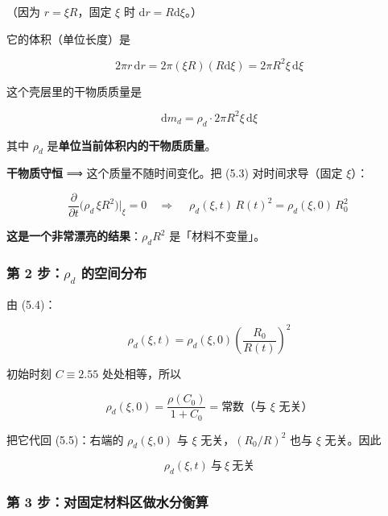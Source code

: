 （因为 $r=\xi R$，固定 $\xi$ 时 $\mathrm{d} r=R\mathrm{d}\xi$。）


它的体积（单位长度）是


\begin{equation}
2\pi r\,\mathrm{d} r=2\pi(\xi R)(R\mathrm{d}\xi)=2\pi R^2\xi\,\mathrm{d}\xi\tag{5.2}
\end{equation}


这个壳层里的干物质质量是


\begin{equation}
\mathrm{d} m_d=\rho_d\cdot2\pi R^2\xi\,\mathrm{d}\xi\tag{5.3}
\end{equation}


其中 $\rho_d$ 是\textbf{单位当前体积内的干物质质量}。


\textbf{干物质守恒} ⟹ 这个质量不随时间变化。把 (5.3) 对时间求导（固定 $\xi$）：


\begin{equation}
\frac{\partial}{\partial t}\Big(\rho_d\,\xi R^2\Big)\Big|_{\xi}=0\quad\Longrightarrow\quad
\boxed{\ \rho_d(\xi,t)\,R(t)^2=\rho_d(\xi,0)\,R_0^2\ }\tag{5.4}
\end{equation}


\textbf{这是一个非常漂亮的结果}：$\rho_dR^2$ 是「材料不变量」。


\subsubsection{第 2 步：$\rho_d$ 的空间分布}


由 (5.4)：


\begin{equation}
\rho_d(\xi,t)=\rho_d(\xi,0)\left(\frac{R_0}{R(t)}\right)^2\tag{5.5}
\end{equation}


初始时刻 $C\equiv2.55$ 处处相等，所以


\begin{equation}
\rho_d(\xi,0)=\frac{\rho(C_0)}{1+C_0}=\text{常数（与 }\xi\text{ 无关）}\tag{5.6}
\end{equation}


把它代回 (5.5)：右端的 $\rho_d(\xi,0)$ 与 $\xi$ 无关，$(R_0/R)^2$ 也与 $\xi$ 无关。因此


\begin{equation}
\boxed{\ \rho_d(\xi,t)\ \text{与}\ \xi\ \text{无关}\ }\tag{5.7}
\end{equation}


\subsubsection{第 3 步：对固定材料区做水分衡算}


